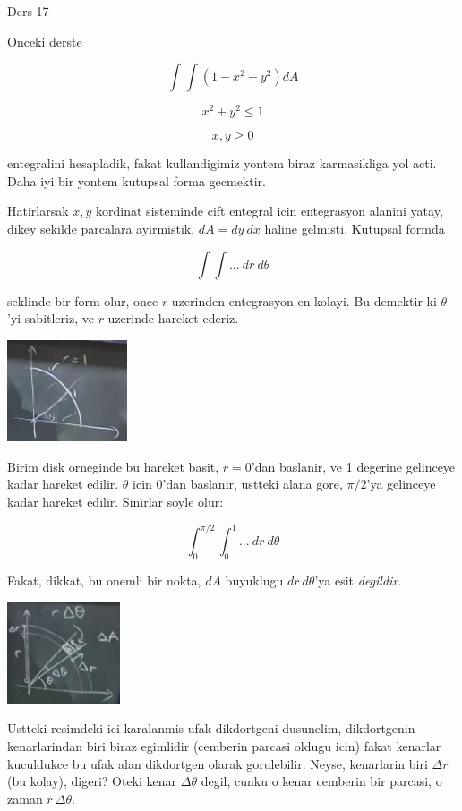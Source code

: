 \documentclass[12pt,fleqn]{article}\usepackage{../common}
\begin{document}
Ders 17

Onceki derste 

\[ \int \int (1-x^2-y^2) dA \]

\[ x^2+y^2 \le 1 \]

\[ x,y \ge 0 \]

entegralini hesapladik, fakat kullandigimiz yontem biraz karmasikliga yol
acti. Daha iyi bir yontem kutupsal forma gecmektir. 

Hatirlarsak $x,y$ kordinat sisteminde cift entegral icin entegrasyon
alanini yatay, dikey sekilde parcalara ayirmistik, $dA = dy \ dx$ haline
gelmisti. Kutupsal formda 

\[ \int \int  ... \ dr \ d\theta\]

seklinde bir form olur, once $r$ uzerinden entegrasyon en kolayi. Bu
demektir ki $\theta$'yi sabitleriz, ve $r$ uzerinde hareket ederiz. 

\includegraphics[height=3cm]{17_1.png}

Birim disk orneginde bu hareket basit, $r=0$'dan baslanir, ve 1 degerine
gelinceye kadar hareket edilir. $\theta$ icin 0'dan baslanir, ustteki alana
gore, $\pi/2$'ya gelinceye kadar hareket edilir. Sinirlar soyle olur:

\[ \int_0^{\pi/2} \int_0^1  ... \ dr \ d\theta\]

Fakat, dikkat, bu onemli bir nokta, $dA$ buyuklugu $dr \ d\theta$'ya esit
{\em degildir}. 

\includegraphics[height=3cm]{17_2.png}

Ustteki resimdeki ici karalanmis ufak dikdortgeni dusunelim, dikdortgenin
kenarlarindan biri biraz egimlidir (cemberin parcasi oldugu icin) fakat
kenarlar kuculdukce bu ufak alan dikdortgen olarak gorulebilir. Neyse,
kenarlarin biri $\Delta r$ (bu kolay), digeri? Oteki kenar $\Delta \theta$
degil, cunku o kenar cemberin bir parcasi, o zaman $r \ \Delta \theta$.
\end{document}
